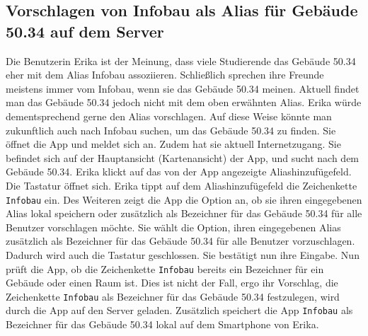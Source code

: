 \subsection{Vorschlagen von Infobau als Alias für Gebäude 50.34 auf dem Server}

Die Benutzerin Erika ist der Meinung, dass viele Studierende das Gebäude 50.34 eher mit dem Alias \glqq Infobau\grqq{} assoziieren.
Schließlich sprechen ihre Freunde meistens immer vom \glqq Infobau\grqq, wenn sie das Gebäude 50.34 meinen.
Aktuell findet man das Gebäude 50.34 jedoch nicht mit dem oben erwähnten Alias.
Erika würde dementsprechend gerne den Alias vorschlagen.
Auf diese Weise könnte man zukunftlich auch nach \glqq Infobau\grqq{} suchen, um das Gebäude 50.34 zu finden.
Sie öffnet die App und meldet sich an.
Zudem hat sie aktuell Internetzugang.
Sie befindet sich auf der Hauptansicht (Kartenansicht) der App, und sucht nach dem Gebäude 50.34.
Erika klickt auf das von der App angezeigte Aliashinzufügefeld. 
Die Tastatur öffnet sich.
Erika tippt auf dem Aliashinzufügefeld die Zeichenkette \texttt{Infobau} ein.
Des Weiteren zeigt die App die Option an, ob sie ihren eingegebenen Alias lokal speichern oder zusätzlich als Bezeichner für das Gebäude 50.34 für alle Benutzer vorschlagen möchte.
Sie wählt die Option, ihren eingegebenen Alias zusätzlich als Bezeichner für das Gebäude 50.34 für alle Benutzer vorzuschlagen. 
Dadurch wird auch die Tastatur geschlossen. 
Sie bestätigt nun ihre Eingabe. 
Nun prüft die App, ob die Zeichenkette \texttt{Infobau} bereits ein Bezeichner für ein Gebäude oder einen Raum ist. 
Dies ist nicht der Fall, ergo ihr Vorschlag, die Zeichenkette \texttt{Infobau} als Bezeichner für das Gebäude 50.34 festzulegen, wird durch die App auf den Server geladen. 
Zusätzlich speichert die App \texttt{Infobau} als Bezeichner für das Gebäude 50.34 lokal auf dem Smartphone von Erika.
